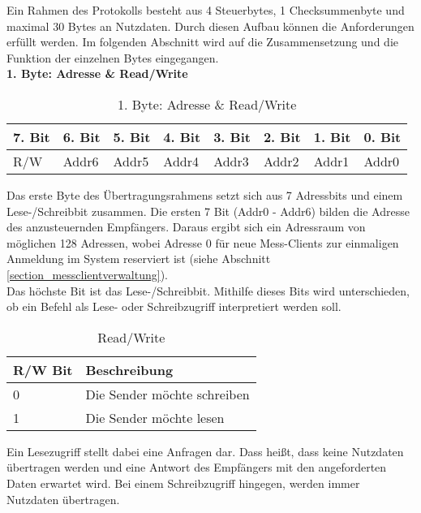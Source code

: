 Ein Rahmen des Protokolls besteht aus 4 Steuerbytes, 1 Checksummenbyte und maximal 30 Bytes an Nutzdaten. Durch diesen Aufbau können die Anforderungen erfüllt werden. Im folgenden Abschnitt wird auf die Zusammensetzung und die Funktion der einzelnen Bytes eingegangen.\\



\newpage
\textbf{1. Byte: Adresse \& Read/Write}

\begin{table}[H]
\begin{center}
\begin{tabularx}{\textwidth}{|X|X|X|X|X|X|X|X|}\hline
 7. Bit & 6. Bit & 5. Bit & 4. Bit & 3. Bit & 2. Bit & 1. Bit & 0. Bit\\ \hline
 R/W & Addr6 & Addr5 & Addr4 & Addr3 & Addr2 & Addr1 & Addr0\\ \hline
\end{tabularx}
\caption{1. Byte: Adresse \& Read/Write}
\label{table_1Byte}
\end{center}
\end{table}

Das erste Byte des Übertragungsrahmens setzt sich aus 7 Adressbits und einem Lese-/Schreibbit zusammen. Die ersten 7 Bit (Addr0 - Addr6) bilden die Adresse des anzusteuernden Empfängers. Daraus ergibt sich ein Adressraum von möglichen 128 Adressen, wobei Adresse 0 für neue Mess-Clients zur einmaligen Anmeldung im System reserviert ist (siehe Abschnitt \ref{section_messclientverwaltung}).\\
Das höchste Bit ist das Lese-/Schreibbit. Mithilfe dieses Bits wird unterschieden, ob ein Befehl als Lese- oder Schreibzugriff interpretiert werden soll.

\begin{table}[H]
\begin{center}
\begin{tabular}{|l|l|}\hline
 R/W Bit & Beschreibung \\ \hline
 0 & Die Sender möchte schreiben \\ \hline
 1 & Die Sender möchte lesen \\ \hline
\end{tabular}
\caption{Read/Write}
\label{table_RW}
\end{center}
\end{table}

Ein Lesezugriff stellt dabei eine Anfragen dar. Dass heißt, dass keine Nutzdaten übertragen werden und eine Antwort des Empfängers mit den angeforderten Daten erwartet wird. Bei einem Schreibzugriff hingegen, werden immer Nutzdaten übertragen.\\


